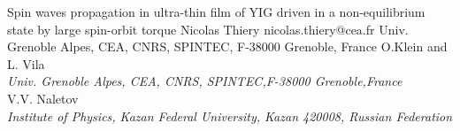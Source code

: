 \begin{conf-abstract}[]
{Spin waves propagation in ultra-thin film of YIG driven in a non-equilibrium state by large spin-orbit torque}
{\color{blue} Nicolas Thiery}
{nicolas.thiery@cea.fr}
{Univ. Grenoble Alpes, CEA, CNRS, SPINTEC, F-38000 Grenoble, France}
{{\color{blue}O.Klein and L. Vila}\\ \textit{Univ. Grenoble Alpes, CEA, CNRS, SPINTEC,F-38000 Grenoble,France}\\ 
{\color{blue}V.V. Naletov}\\ \textit{ Institute of Physics, Kazan Federal University, Kazan 420008, Russian Federation}\\ 
\decofourleft \decofourright}





\printbibliography[heading=none]

\end{conf-abstract}
